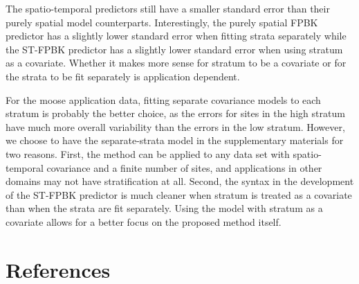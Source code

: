 \documentclass[smallextended]{svjour3}       %
\begin{document}
The spatio-temporal predictors still have a smaller standard error than
their purely spatial model counterparts. Interestingly, the purely
spatial FPBK predictor has a slightly lower standard error when fitting
strata separately while the ST-FPBK predictor has a slightly lower
standard error when using stratum as a covariate. Whether it makes more
sense for stratum to be a covariate or for the strata to be fit
separately is application dependent.

For the moose application data, fitting separate covariance models to
each stratum is probably the better choice, as the errors for sites in
the high stratum have much more overall variability than the errors in
the low stratum. However, we choose to have the separate-strata model in
the supplementary materials for two reasons. First, the method can be
applied to any data set with spatio-temporal covariance and a finite
number of sites, and applications in other domains may not have
stratification at all. Second, the syntax in the development of the
ST-FPBK predictor is much cleaner when stratum is treated as a covariate
than when the strata are fit separately. Using the model with stratum as
a covariate allows for a better focus on the proposed method itself.

\hypertarget{references}{%
\section*{References}\label{references}}
\end{document}
